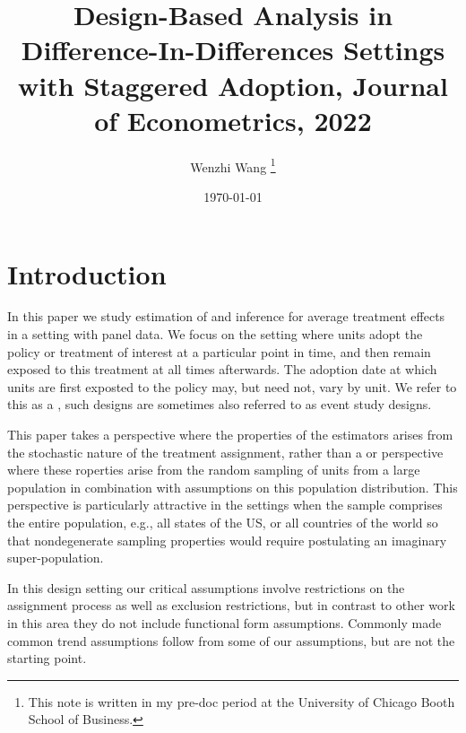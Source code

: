 \documentclass[12pt]{article}
\newcommand{\highlightB}[1]{{\emph{\color{MyBlue}{#1}}}}
\newcommand{\highlightP}[1]{{\emph{\color{MyPink}{#1}}}}
\theoremstyle{definition}
\begin{document}

\title{\bf Design-Based Analysis in Difference-In-Differences Settings with Staggered Adoption, Journal of Econometrics, 2022}
\author{Wenzhi Wang \thanks{This note is written in my pre-doc period at the University of Chicago Booth School of Business.} } 
\date{\today}
\maketitle

\citet{atheyDesignBasedAnalysisDifferenceinDifferences2022a}

\section{Introduction}

In this paper we study estimation of and inference for average treatment effects in a setting with panel data. We focus on the setting where units adopt the policy or treatment of interest at a particular point in time, and then remain exposed to this treatment at all times afterwards. The adoption date at which units are first exposted to the policy may, but need not, vary by unit. We refer to this as a \highlightB{staggered adoption design (SAD)}, such designs are sometimes also referred to as event study designs. 

This paper takes a \highlightP{design-based} perspective where the properties of the estimators arises from the stochastic nature of the treatment assignment, rather than a \highlightP{sampling-based} or \highlightP{model-based} perspective where these roperties arise from the random sampling of units from a large population in combination with assumptions on this population distribution. This perspective is particularly attractive in the settings when the sample comprises the entire population, e.g., all states of the US, or all countries of the world so that nondegenerate sampling properties would require postulating an imaginary super-population. 

In this design setting our critical assumptions involve restrictions on the assignment process as well as exclusion restrictions, but in contrast to other work in this area they do not include functional form assumptions. Commonly made common trend assumptions follow from some of our assumptions, but are not the starting point. 
\end{document}
